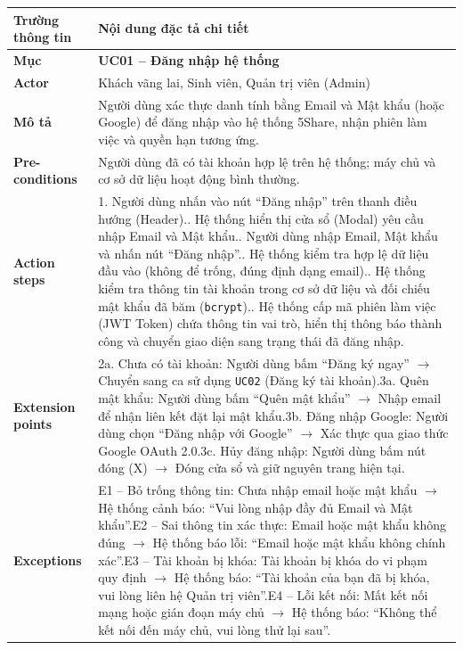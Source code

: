 \begin{table}[H]
\centering
\footnotesize\linespread{1.05}\selectfont
\setlength{\tabcolsep}{5pt}
\renewcommand{\arraystretch}{1.12}
\begin{tabularx}{\textwidth}{|p{3.5cm}|X|}
\hline
\rowcolor[HTML]{EAEAEA}
\textbf{Trường thông tin} & \textbf{Nội dung đặc tả chi tiết} \\
\hline
\textbf{Mục} & \textbf{UC01 -- Đăng nhập hệ thống} \\
\hline
\textbf{Actor} & Khách vãng lai, Sinh viên, Quản trị viên (Admin) \\
\hline
\textbf{Mô tả} & Người dùng xác thực danh tính bằng Email và Mật khẩu (hoặc Google) để đăng nhập vào hệ thống 5Share, nhận phiên làm việc và quyền hạn tương ứng. \\
\hline
\textbf{Pre-conditions} & Người dùng đã có tài khoản hợp lệ trên hệ thống; máy chủ và cơ sở dữ liệu hoạt động bình thường. \\
\hline
\textbf{Action steps} & 1. Người dùng nhấn vào nút ``Đăng nhập'' trên thanh điều hướng (Header).\newline 2. Hệ thống hiển thị cửa sổ (Modal) yêu cầu nhập Email và Mật khẩu.\newline 3. Người dùng nhập Email, Mật khẩu và nhấn nút ``Đăng nhập''.\newline 4. Hệ thống kiểm tra hợp lệ dữ liệu đầu vào (không để trống, đúng định dạng email).\newline 5. Hệ thống kiểm tra thông tin tài khoản trong cơ sở dữ liệu và đối chiếu mật khẩu đã băm (\texttt{bcrypt}).\newline 6. Hệ thống cấp mã phiên làm việc (JWT Token) chứa thông tin vai trò, hiển thị thông báo thành công và chuyển giao diện sang trạng thái đã đăng nhập. \\
\hline
\textbf{Extension points} & 2a. Chưa có tài khoản: Người dùng bấm ``Đăng ký ngay'' $\rightarrow$ Chuyển sang ca sử dụng \texttt{UC02} (Đăng ký tài khoản).\newline 3a. Quên mật khẩu: Người dùng bấm ``Quên mật khẩu'' $\rightarrow$ Nhập email để nhận liên kết đặt lại mật khẩu.\newline 3b. Đăng nhập Google: Người dùng chọn ``Đăng nhập với Google'' $\rightarrow$ Xác thực qua giao thức Google OAuth 2.0.\newline 3c. Hủy đăng nhập: Người dùng bấm nút đóng (X) $\rightarrow$ Đóng cửa sổ và giữ nguyên trang hiện tại. \\
\hline
\textbf{Exceptions} & E1 -- Bỏ trống thông tin: Chưa nhập email hoặc mật khẩu $\rightarrow$ Hệ thống cảnh báo: ``Vui lòng nhập đầy đủ Email và Mật khẩu''.\newline E2 -- Sai thông tin xác thực: Email hoặc mật khẩu không đúng $\rightarrow$ Hệ thống báo lỗi: ``Email hoặc mật khẩu không chính xác''.\newline E3 -- Tài khoản bị khóa: Tài khoản bị khóa do vi phạm quy định $\rightarrow$ Hệ thống báo: ``Tài khoản của bạn đã bị khóa, vui lòng liên hệ Quản trị viên''.\newline E4 -- Lỗi kết nối: Mất kết nối mạng hoặc gián đoạn máy chủ $\rightarrow$ Hệ thống báo: ``Không thể kết nối đến máy chủ, vui lòng thử lại sau''. \\

\end{tabularx}
\end{table}
